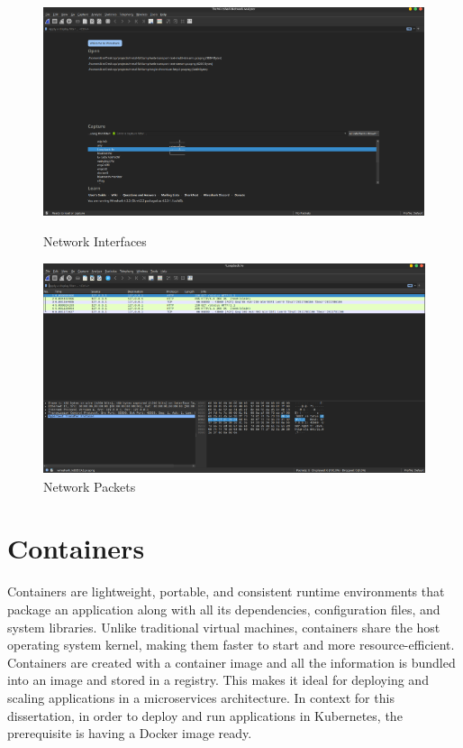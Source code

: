 \begin{figure}[H]
\centering
\begin{minipage}{0.9\textwidth}
  \centering
  \includegraphics[width=\textwidth]{SOA/ws_interfaces.png}
  \caption{Network Interfaces}
\end{minipage}
\hfill
\begin{minipage}{0.9\textwidth}
  \centering
  \includegraphics[width=\textwidth]{SOA/ws_packet.png}
  \caption{Network Packets}
\end{minipage}
\end{figure}



\section{Containers}
Containers are lightweight, portable, and consistent runtime environments that package an application along with all its dependencies, configuration files, and system libraries. Unlike traditional virtual machines, containers share the host operating system kernel, making them faster to start and more resource-efficient. Containers are created with a container image and all the information is bundled into an image and stored in a registry. This makes it ideal for deploying and scaling applications in a microservices architecture. In context for this dissertation, in order to deploy and run applications in Kubernetes, the prerequisite is having a Docker image ready.

